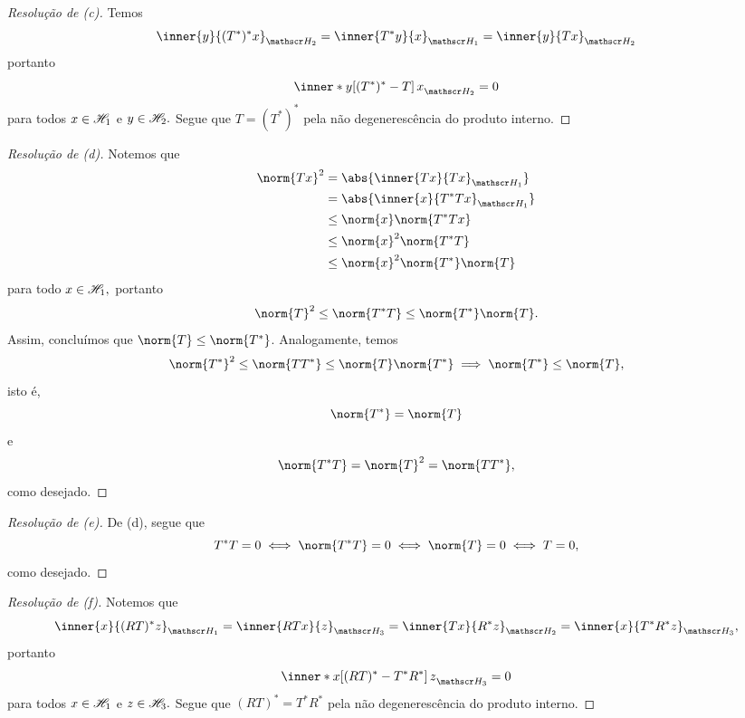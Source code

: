 \begin{proof}[Resolução de (c)]
  Temos
  \begin{equation*}
    \inner{y}{(T^*)^*x}_{\hilbert_2} = \inner{T^*y}{x}_{\hilbert_1} = \inner{y}{Tx}_{\hilbert_2}
  \end{equation*}
  portanto
  \begin{equation*}
    \inner*{y}{\left[(T^*)^* - T\right]x}_{\hilbert_2} = 0
  \end{equation*}
  para todos \(x \in \mathscr{H}_1\) e \(y \in \mathscr{H}_2.\) Segue que \(T = (T^*)^*\) pela não degenerescência do produto interno.
\end{proof}
\begin{proof}[Resolução de (d)]
  Notemos que
  \begin{align*}
    \norm{Tx}^2 &= \abs{\inner{Tx}{Tx}_{\hilbert_1}}\\
                &= \abs{\inner{x}{T^*T x}_{\hilbert_1}}\\
                &\leq \norm{x} \norm{T^*T x}\\
                &\leq \norm{x}^2 \norm{T^*T}\\
                &\leq \norm{x}^2 \norm{T^*} \norm{T}
  \end{align*}
  para todo \(x \in \mathscr{H}_1,\) portanto
  \begin{equation*}
    \norm{T}^2 \leq \norm{T^*T} \leq \norm{T^*} \norm{T}.
  \end{equation*}
  Assim, concluímos que \(\norm{T} \leq \norm{T^*}\). Analogamente, temos
  \begin{equation*}
    \norm{T^*}^2 \leq \norm{TT^*} \leq \norm{T} \norm{T^*} \implies \norm{T^*} \leq \norm{T},
  \end{equation*}
  isto é,
  \begin{equation*}
    \norm{T^*} = \norm{T}
  \end{equation*}
  e
  \begin{equation*}
    \norm{T^*T} = \norm{T}^2 = \norm{TT^*},
  \end{equation*}
  como desejado.
\end{proof}
\begin{proof}[Resolução de (e)]
  De (d), segue que
  \begin{equation*}
    T^*T = 0 \iff \norm{T^*T} = 0 \iff \norm{T} = 0 \iff T = 0,
  \end{equation*}
  como desejado.
\end{proof}
\begin{proof}[Resolução de (f)]
  Notemos que
  \begin{equation*}
    \inner{x}{(RT)^*z}_{\hilbert_1} = \inner{RTx}{z}_{\hilbert_3} = \inner{Tx}{R^*z}_{\hilbert_2} = \inner{x}{T^*R^*z}_{\hilbert_3},
  \end{equation*}
  portanto
  \begin{equation*}
    \inner*{x}{\left[(RT)^* - T^* R^*\right]z}_{\hilbert_3} = 0
  \end{equation*}
  para todos \(x \in \mathscr{H}_1\) e \(z \in \mathscr{H}_3.\) Segue que \((RT)^* = T^* R^*\) pela não degenerescência do produto interno.
\end{proof}
